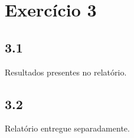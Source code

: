 
\section*{\large Exercício 3}
%




\subsection*{3.1} 
%

Resultados presentes no relatório.

\subsection*{3.2} 
%

Relatório entregue separadamente.






